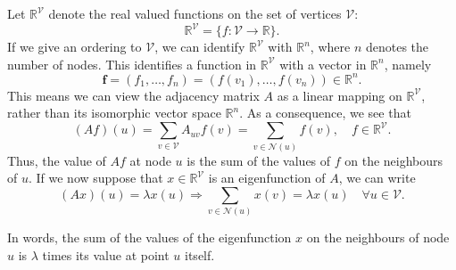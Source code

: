 \documentclass[12pt,a4paper]{report}
\theoremstyle{definition}
\begin{document}
Let $\mathbb{R}^{\mathcal{V}}$ denote the real valued functions on the set of vertices $\mathcal{V}$:
\begin{equation*}
    \mathbb{R}^{\mathcal{V}} = \{ f : \mathcal{V} \rightarrow \mathbb{R} \} .
\end{equation*}
If we give an ordering to $\mathcal{V}$, we can identify $\mathbb{R}^{\mathcal{V}}$ with $\mathbb{R}^n$, where $n$ denotes the number of nodes.
This identifies a function in $\mathbb{R}^{\mathcal{V}}$ with a vector in $\mathbb{R}^n$, namely
\begin{equation*}
    \mathbf{f} = \left( f_1 , \ldots , f_n \right) = 
    \left( f(v_1) , \ldots , f(v_n) \right) \in \mathbb{R}^n .
\end{equation*}
This means we can view the adjacency matrix $A$ as a linear mapping on $\mathbb{R}^{\mathcal{V}}$, rather than its isomorphic vector space $\mathbb{R}^n$. As a consequence, we see that 
\begin{equation*}
    \left( A f \right) (u) = \sum_{v \in \mathcal{V}} A_{uv} f(v) = \sum_{v \in \mathcal{N}(u)} f (v) , \quad f \in \mathbb{R}^{\mathcal{V}} .
\end{equation*}
Thus, the value of $Af$ at node $u$ is the sum of the values of $f$ on the neighbours of $u$.
If we now suppose that $x \in \mathbb{R}^{\mathcal{V}}$ is an eigenfunction of $A$, we can write
\begin{equation*}
    \left( A x \right) ( u ) = \lambda x ( u ) \Longrightarrow \sum_{v \in \mathcal{N}(u)} x(v) = \lambda x(u) \quad \forall u \in \mathcal{V}.
\end{equation*}

In words, the sum of the values of the eigenfunction $x$ on the neighbours of node $u$ is $\lambda$ times its value at point $u$ itself.
\end{document}
